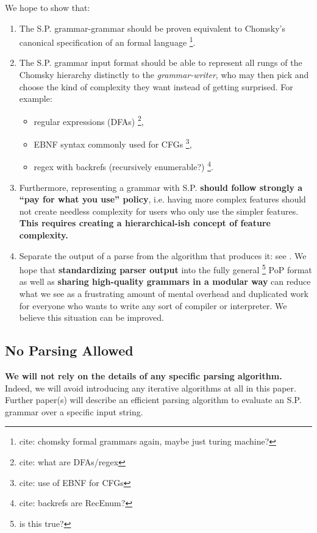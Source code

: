 \documentclass[10pt]{article}
\newcommand{\todocite}[1]{\footnote{cite: #1}}
\begin{document}
We hope to show that:
\begin{enumerate}
  \item The S.P. grammar-grammar should be proven equivalent to Chomsky's canonical specification of an formal language \todocite{chomsky formal grammars again, maybe just turing machine?}.
  \item The S.P. grammar input format should be able to represent all rungs of the Chomsky hierarchy distinctly to the \textit{grammar-writer}, who may then pick and choose the kind of complexity they want instead of getting surprised. For example: \begin{itemize}
      \item regular expressions (DFAs) \todocite{what are DFAs/regex}, \\
      \item EBNF syntax commonly used for CFGs \todocite{use of EBNF for CFGs}, \\
      \item regex with backrefs (recursively enumerable?) \todocite{backrefs are RecEnum?}.
    \end{itemize}
  \item Furthermore, representing a grammar with S.P. \textbf{should follow strongly a ``pay for what you use'' policy}, i.e. having more complex features should not create needless complexity for users who only use the simpler features. \textbf{This requires creating a hierarchical-ish concept of feature complexity.}
  \item Separate the output of a parse from the algorithm that produces it: see . We hope that \textbf{standardizing parser output} into the fully general \footnote{is this true?} PoP format as well as \textbf{sharing high-quality grammars in a modular way} can reduce what we see as a frustrating amount of mental overhead and duplicated work for everyone who wants to write any sort of compiler or interpreter. We believe this situation can be improved.
\end{enumerate}

\subsection{No Parsing Allowed}
\label{sec:no-parsing-allowed}
\textbf{We will not rely on the details of any specific parsing algorithm.} Indeed, we will avoid introducing any iterative algorithms at all in this paper. Further paper(s) will describe an efficient parsing algorithm to evaluate an S.P. grammar over a specific input string.
\end{document}
